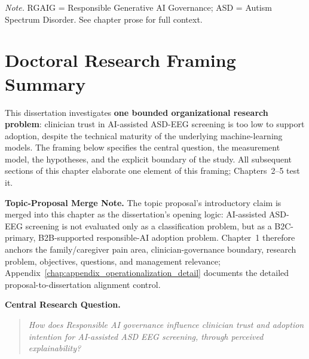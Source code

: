 \vspace{0.3em}\noindent\textit{Note.} RGAIG = Responsible Generative AI Governance; ASD = Autism Spectrum Disorder. See chapter prose for full context.

\label{chap:introduction}

\normalsize\normalfont\color{black}%


\section*{Doctoral Research Framing Summary}
\label{sec:dba_framing}

This dissertation investigates \textbf{one bounded organizational research problem}: clinician trust in AI-assisted ASD-EEG screening is too low to support adoption, despite the technical maturity of the underlying machine-learning models. The framing below specifies the central question, the measurement model, the hypotheses, and the explicit boundary of the study. All subsequent sections of this chapter elaborate one element of this framing; Chapters~2--5 test it.

\noindent\textbf{Topic-Proposal Merge Note.}
The topic proposal's introductory claim is merged into this chapter as the dissertation's opening logic: AI-assisted ASD-EEG screening is not evaluated only as a classification problem, but as a B2C-primary, B2B-supported responsible-AI adoption problem. Chapter~1 therefore anchors the family/caregiver pain area, clinician-governance boundary, research problem, objectives, questions, and management relevance; Appendix~\ref{chap:appendix_operationalization_detail} documents the detailed proposal-to-dissertation alignment control.

\noindent\textbf{Central Research Question.}
\begin{quote}
\emph{How does Responsible AI governance influence clinician trust and adoption intention for AI-assisted ASD EEG screening, through perceived explainability?}
\end{quote}

